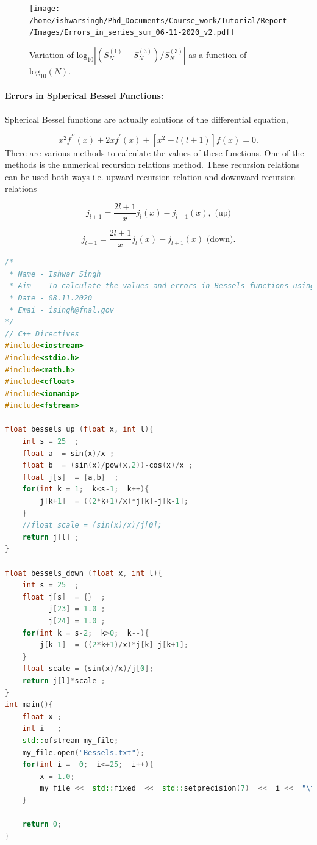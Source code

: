 \documentclass[a4,12pt]{article}
\numberwithin{equation}{subsection}
\begin{document}
\begin{figure}[h]
    \centering
    \texttt{[image: /home/ishwarsingh/Phd\_Documents/Course\_work/Tutorial/Report/Images/Errors\_in\_series\_sum\_06-11-2020\_v2.pdf]}
  \caption{Variation of $\text{log}_{10}|(S^{(1)}_N-S^{(3)}_N)/S^{(3)}_N|$ as a function of $\text{log}_{10}(N)$.}
  \label{series_sum}
\end{figure}

\paragraph{Errors in Spherical Bessel Functions: } Spherical Bessel functions are actually solutions of the differential equation,

\begin{equation}
  x^2 f^{\prime\prime}(x)+ 2x f^{\prime}(x)+[x^2-l(l+1)]f(x)=0.
\end{equation}
There are various methods to calculate the values of these functions. One of the methods is the numerical recursion relations method. These recursion relations can be used both ways i.e. upward recursion relation and downward recursion relations

\begin{equation}
  j_{l+1} = \frac{2l+1}{x}j_l(x) - j_{l-1}(x), \text{ (up)}
\end{equation}

\begin{equation}
  j_{l-1} = \frac{2l+1}{x}j_l(x) - j_{l+1}(x) \text{ (down).}
\end{equation}

\begin{lstlisting}[language=C++, caption= C++ code to calculate the Bessel functions using upward and downward recursion relations and the associated errors., label= list2]
/*
 * Name - Ishwar Singh
 * Aim  - To calculate the values and errors in Bessels functions using recursion relations.
 * Date - 08.11.2020
 * Emai - isingh@fnal.gov
*/
// C++ Directives
#include<iostream>
#include<stdio.h>
#include<math.h>
#include<cfloat>
#include<iomanip>
#include<fstream>

float bessels_up (float x, int l){
    int s = 25  ;
    float a  = sin(x)/x ;
    float b  = (sin(x)/pow(x,2))-cos(x)/x ;
    float j[s]  = {a,b}  ;
    for(int k = 1;  k<s-1;  k++){
        j[k+1]  = ((2*k+1)/x)*j[k]-j[k-1];
    }
    //float scale = (sin(x)/x)/j[0]; 
    return j[l] ;
}

float bessels_down (float x, int l){
    int s = 25  ;
    float j[s]  = {}  ;
          j[23] = 1.0 ;
          j[24] = 1.0 ;
    for(int k = s-2;  k>0;  k--){
        j[k-1]  = ((2*k+1)/x)*j[k]-j[k+1];
    }
    float scale = (sin(x)/x)/j[0]; 
    return j[l]*scale ;
}
int main(){
    float x ;
    int i   ;
    std::ofstream my_file;
    my_file.open("Bessels.txt");
    for(int i =  0;  i<=25;  i++){
        x = 1.0;
        my_file <<  std::fixed  <<  std::setprecision(7)  <<  i <<  "\t"  <<  bessels_up(x,i) <<  "\t"  <<  bessels_down(x,i) <<  "\t"  << abs(bessels_up(x,i)-bessels_down(x,i))/(abs(bessels_up(x,i))+abs(bessels_down(x,i))) <<    std::endl;
    }

    return 0;
}
\end{lstlisting}
\end{document}
